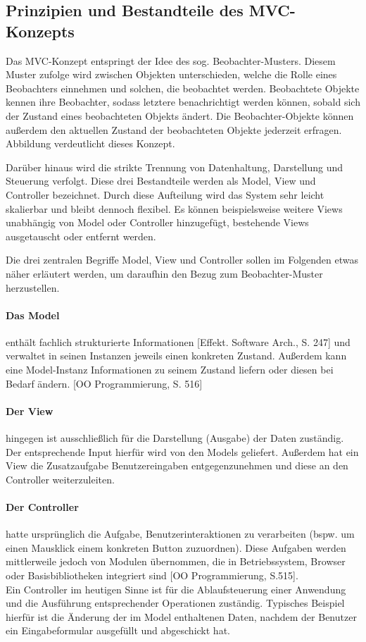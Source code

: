 \subsection{Prinzipien und Bestandteile des MVC-Konzepts}
Das MVC-Konzept entspringt der Idee des sog. Beobachter-Musters. Diesem Muster zufolge wird zwischen Objekten unterschieden, welche die Rolle eines Beobachters einnehmen und solchen, die beobachtet werden. %
Beobachtete Objekte kennen ihre Beobachter, sodass letztere benachrichtigt werden können, sobald sich der Zustand eines beobachteten Objekts ändert. Die Beobachter-Objekte können außerdem den aktuellen Zustand der beobachteten Objekte jederzeit erfragen. Abbildung %
verdeutlicht dieses Konzept.

Darüber hinaus wird die strikte Trennung von Datenhaltung, Darstellung und Steuerung verfolgt. Diese drei Bestandteile werden als Model, View und Controller bezeichnet. Durch diese Aufteilung wird das System sehr leicht skalierbar und bleibt dennoch flexibel. Es können beispielsweise weitere Views unabhängig von Model oder Controller hinzugefügt, bestehende Views ausgetauscht oder entfernt werden.

Die drei zentralen Begriffe Model, View und Controller sollen im Folgenden etwas näher erläutert werden, um daraufhin den Bezug zum Beobachter-Muster herzustellen.

\paragraph{Das Model} enthält fachlich strukturierte Informationen [Effekt. Software Arch., S. 247] und verwaltet in seinen Instanzen jeweils einen konkreten Zustand. Außerdem kann eine Model-Instanz Informationen zu seinem Zustand liefern oder diesen bei Bedarf ändern. [OO Programmierung, S. 516] 

\paragraph{Der View} hingegen ist ausschließlich für die Darstellung (Ausgabe) der Daten zuständig. Der entsprechende Input hierfür wird von den Models geliefert. Außerdem hat ein View die Zusatzaufgabe Benutzereingaben entgegenzunehmen und diese an den Controller weiterzuleiten. %

\paragraph{Der Controller} hatte ursprünglich die Aufgabe, Benutzerinteraktionen zu verarbeiten (bspw. um einen Mausklick einem konkreten Button zuzuordnen). Diese Aufgaben werden mittlerweile jedoch von Modulen übernommen, die in Betriebssystem, Browser oder Basisbibliotheken integriert sind [OO Programmierung, S.515].\\
Ein Controller im heutigen Sinne ist für die Ablaufsteuerung einer Anwendung und die Ausführung entsprechender Operationen zuständig. Typisches Beispiel hierfür ist die Änderung der im Model enthaltenen Daten, nachdem der Benutzer ein Eingabeformular ausgefüllt und abgeschickt hat.

